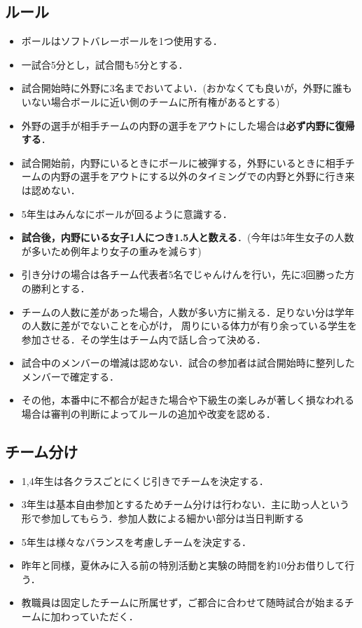 \documentclass[dvipdfmx]{jsarticle}
\begin{document}
\subsection{ルール}
\begin{itemize}
  \item ボールはソフトバレーボールを1つ使用する．
  \item 一試合5分とし，試合間も5分とする．
  \item 試合開始時に外野に3名までおいてよい．(おかなくても良いが，外野に誰もいない場合ボールに近い側のチームに所有権があるとする)
  \item 外野の選手が相手チームの内野の選手をアウトにした場合は{\bf 必ず内野に復帰する}．
  \item 試合開始前，内野にいるときにボールに被弾する，外野にいるときに相手チームの内野の選手をアウトにする以外のタイミングでの内野と外野に行き来は認めない．
  \item 5年生はみんなにボールが回るように意識する．
  \item {\bf 試合後，内野にいる女子1人につき1.5人と数える}．(今年は5年生女子の人数が多いため例年より女子の重みを減らす)
  \item 引き分けの場合は各チーム代表者5名でじゃんけんを行い，先に3回勝った方の勝利とする．
  \item チームの人数に差があった場合，人数が多い方に揃える．足りない分は学年の人数に差がでないことを心がけ，
        周りにいる体力が有り余っている学生を参加させる．その学生はチーム内で話し合って決める．
  \item 試合中のメンバーの増減は認めない．試合の参加者は試合開始時に整列したメンバーで確定する．
  \item その他，本番中に不都合が起きた場合や下級生の楽しみが著しく損なわれる場合は審判の判断によってルールの追加や改変を認める．
\end{itemize}

\subsection{チーム分け}\label{team}
\begin{itemize}
  \item 1,4年生は各クラスごとにくじ引きでチームを決定する．
  \item 3年生は基本自由参加とするためチーム分けは行わない．主に助っ人という形で参加してもらう．参加人数による細かい部分は当日判断する
  \item 5年生は様々なバランスを考慮しチームを決定する．
  \item 昨年と同様，夏休みに入る前の特別活動と実験の時間を約10分お借りして行う．
  \item 教職員は固定したチームに所属せず，ご都合に合わせて随時試合が始まるチームに加わっていただく．
\end{itemize}
\end{document}
